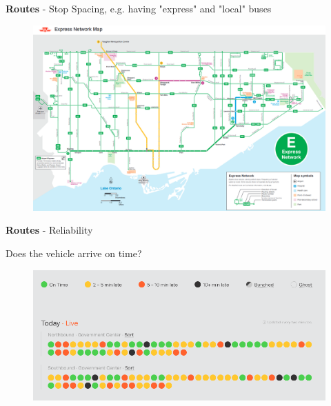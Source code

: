 \documentclass[aspectratio=169]{beamer}
\begin{document}
\begin{frame}
	
	\textbf{Routes} - Stop Spacing, e.g. having "express" and "local" buses
	
	\begin{figure}
		\centering
		\includegraphics[width=0.9\linewidth]{images/ttc_express.png}
	\end{figure}
	
	
\end{frame}



\begin{frame}
	
	\textbf{Routes} - Reliability
	
	\vspace{2mm}
	
	Does the vehicle arrive on time?
	
	\vspace{2mm}
	

		\begin{figure}
			\centering
			\includegraphics[width=1\linewidth]{images/transit-miami-screenshot.png}
		\end{figure}

	
\end{frame}
\end{document}
